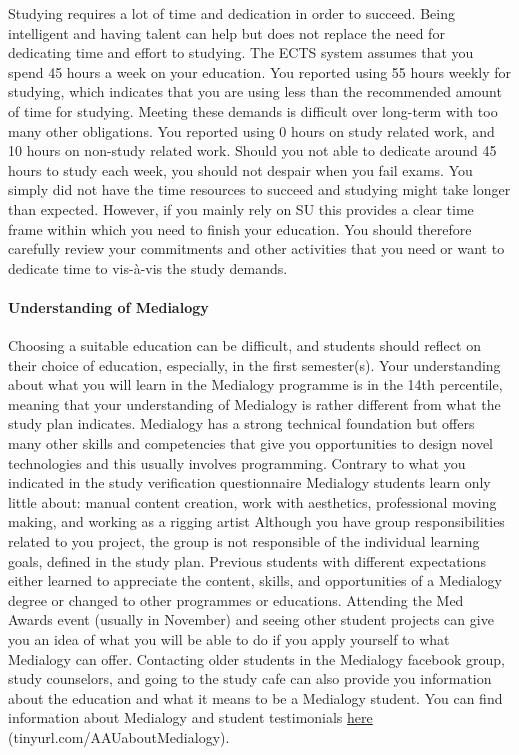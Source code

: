 \documentclass[]{article}
\let\oldparagraph\paragraph
\renewcommand{\paragraph}[1]{\oldparagraph{#1}\mbox{}}
\begin{document}
Studying requires a lot of time and dedication in order to succeed.
Being intelligent and having talent can help but does not replace the
need for dedicating time and effort to studying. The ECTS system assumes
that you spend 45 hours a week on your education. You reported using 55
hours weekly for studying, which indicates that you are using less than
the recommended amount of time for studying. Meeting these demands is
difficult over long-term with too many other obligations. You reported
using 0 hours on study related work, and 10 hours on non-study related
work. Should you not able to dedicate around 45 hours to study each
week, you should not despair when you fail exams. You simply did not
have the time resources to succeed and studying might take longer than
expected. However, if you mainly rely on SU this provides a clear time
frame within which you need to finish your education. You should
therefore carefully review your commitments and other activities that
you need or want to dedicate time to vis-à-vis the study demands.

\paragraph{Understanding of Medialogy}\label{understanding-of-medialogy}

Choosing a suitable education can be difficult, and students should
reflect on their choice of education, especially, in the first
semester(s). Your understanding about what you will learn in the
Medialogy programme is in the 14th percentile, meaning that your
understanding of Medialogy is rather different from what the study plan
indicates. Medialogy has a strong technical foundation but offers many
other skills and competencies that give you opportunities to design
novel technologies and this usually involves programming. Contrary to
what you indicated in the study verification questionnaire Medialogy
students learn only little about: manual content creation, work with
aesthetics, professional moving making, and working as a rigging artist
Although you have group responsibilities related to you project, the
group is not responsible of the individual learning goals, defined in
the study plan. Previous students with different expectations either
learned to appreciate the content, skills, and opportunities of a
Medialogy degree or changed to other programmes or educations. Attending
the Med Awards event (usually in November) and seeing other student
projects can give you an idea of what you will be able to do if you
apply yourself to what Medialogy can offer. Contacting older students in
the Medialogy facebook group, study counselors, and going to the study
cafe can also provide you information about the education and what it
means to be a Medialogy student. You can find information about
Medialogy and student testimonials
\href{tinyurl.com/AAUaboutMedialogy}{here}
(tinyurl.com/AAUaboutMedialogy).
\end{document}
